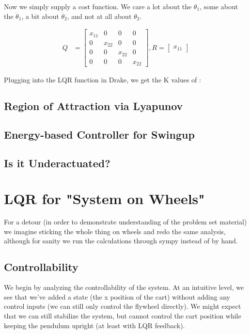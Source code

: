 \documentclass[conference]{IEEEtran}
\begin{document}
Now we simply supply a cost function. We care a lot about the $\theta_1$, some about
the $\dot\theta_1$, a bit about $\dot\theta_2$, and not at all about $\theta_2$.

\begin{align}
    Q &=
    \begin{bmatrix}
        x_{11}       & 0 & 0 & 0 \\
        0 & x_{22} & 0 & 0 \\
        0 & 0 & x_{22} & 0 \\
        0 & 0 & 0 & x_{22}
    \end{bmatrix}, R = \begin{bmatrix} x_{11}  \end{bmatrix}
\end{align}

Plugging into the LQR function in Drake, we get the K values of :

\subsection{Region of Attraction via Lyapunov}

\subsection{Energy-based Controller for Swingup}

\subsection{Is it Underactuated?}

\section{LQR for "System on Wheels"}


For a detour (in order to demonstrate understanding of the problem set material)
we imagine sticking the whole thing on wheels and redo the same analysis,
although for sanity we run the calculations through sympy instead of by hand.
\cite{JS-aruco}


\subsection{Controllability}

We begin by analyzing the controllability of the system. At an intuitive level,
we see that we've added a state (the x position of the cart) without adding any
control inputs (we can still only control the flywheel directly). We might
expect that we can still stabilize the system, but cannot control the cart
position while keeping the pendulum upright (at least with LQR feedback).
\end{document}
